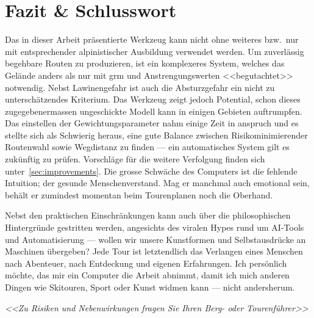 \section{Fazit \& Schlusswort}

Das in dieser Arbeit präsentierte Werkzeug kann nicht ohne weiteres bzw.\ nur mit entsprechender alpinistischer Ausbildung verwendet werden. Um zuverlässig begehbare Routen zu produzieren, ist ein komplexeres System, welches das Gelände anders als nur mit \gls{grm} und Anstrengungswerten <<begutachtet>> notwendig. Nebst Lawinengefahr ist auch die Absturzgefahr ein nicht zu unterschätzendes Kriterium. Das Werkzeug zeigt jedoch Potential, schon dieses zugegebenermassen ungeschickte Modell kann in einigen Gebieten auftrumpfen. Das einstellen der Gewichtungsparameter nahm einige Zeit in anspruch und es stellte sich als Schwierig heraus, eine gute Balance zwischen Risikominimierender Routenwahl sowie Wegdistanz zu finden --- ein automatisches System gilt es zukünftig zu prüfen. Vorschläge für die weitere Verfolgung finden sich unter\ \ref{sec:improvements}. Die grosse Schwäche des Computers ist die fehlende Intuition; der gesunde Menschenverstand. Mag er manchmal auch emotional sein, behält er zumindest momentan beim Tourenplanen noch die Oberhand. 

Nebst den praktischen Einschränkungen kann auch über die philosophischen Hintergründe gestritten werden, angesichts des viralen Hypes rund um AI-Tools und Automatisierung --- wollen wir unsere Kunstformen und Selbstausdrücke an Maschinen übergeben? Jede Tour ist letztendlich das Verlangen eines Menschen nach Abenteuer, nach Entdeckung und eigenen Erfahrungen. Ich persönlich möchte, das mir ein Computer die Arbeit abnimmt, damit ich mich anderen Dingen wie Skitouren, Sport oder Kunst widmen kann --- nicht andersherum.

\large{
  \textit{<<Zu Risiken und Nebenwirkungen fragen Sie Ihren Berg- oder Tourenführer>>}
}